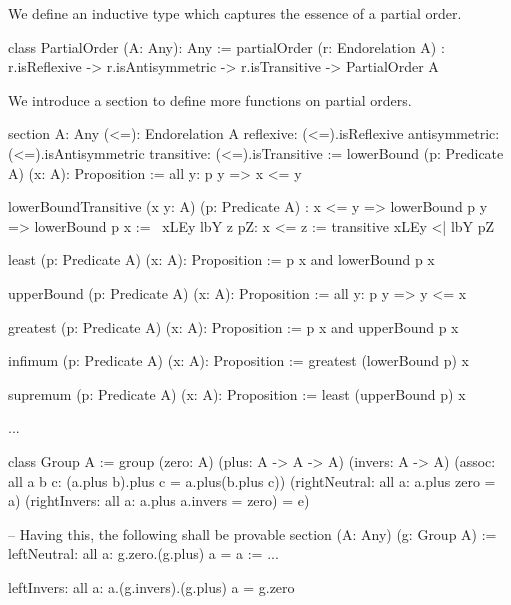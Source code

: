 \begin{alba}
\end{alba}







We define an inductive type which captures the essence of a partial order.

\begin{alba}
    class
        PartialOrder (A: Any): Any
    :=
        partialOrder
            (r: Endorelation A)
            :   r.isReflexive -> r.isAntisymmetric -> r.isTransitive
                -> PartialOrder A
\end{alba}


We introduce a section to define more functions on partial orders.

\begin{alba}
    section
        A: Any
        (<=): Endorelation A
        reflexive: (<=).isReflexive
        antisymmetric: (<=).isAntisymmetric
        transitive: (<=).isTransitive
    :=
        lowerBound (p: Predicate A) (x: A): Proposition :=
            all y: p y => x <= y

        lowerBoundTransitive
            (x y: A) (p: Predicate A)
            : x <= y => lowerBound p y => lowerBound p x
        :=
            \ xLEy lbY z pZ: x <= z :=
                transitive xLEy <| lbY pZ

        least (p: Predicate A) (x: A): Proposition :=
            p x and lowerBound p x

        upperBound (p: Predicate A) (x: A): Proposition :=
            all y: p y => y <= x

        greatest (p: Predicate A) (x: A): Proposition :=
            p x and upperBound p x

        infimum (p: Predicate A)  (x: A): Proposition :=
            greatest (lowerBound p) x

        supremum (p: Predicate A)  (x: A): Proposition :=
            least (upperBound p) x

        ...
\end{alba}








\begin{alba}
\end{alba}





\begin{alba}
    class Group A :=
        group
            (zero: A)
            (plus: A -> A -> A)
            (invers: A -> A)
            (assoc: all a b c: (a.plus b).plus c = a.plus(b.plus c))
            (rightNeutral: all a: a.plus zero = a)
            (rightInvers:  all a: a.plus a.invers = zero) = e)

    -- Having this, the following shall be provable
    section
        (A: Any)
        (g: Group A)
    :=
        leftNeutral: all a: g.zero.(g.plus) a = a := ...

        leftInvers:  all a: a.(g.invers).(g.plus) a = g.zero
\end{alba}

